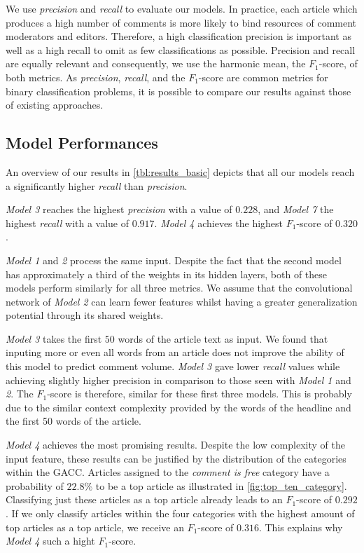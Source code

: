 We use \textit{precision} and \textit{recall} to evaluate our models. 
In practice, each article which produces a high number of comments is more likely to bind resources of comment moderators and editors.
Therefore, a high classification precision is important as well as a high recall to omit as few classifications as possible.
Precision and recall are equally relevant and consequently, we use the harmonic mean, the $F_1$-score, of both metrics. As \textit{precision}, \textit{recall}, and the $F_1$-score are common metrics for binary classification problems, it is possible to compare our results against those of existing approaches.

\subsection{Model Performances}
An overview of our results in \autoref{tbl:results_basic} depicts that all our models reach a significantly higher \textit{recall} than \textit{precision}.

\textit{Model 3} reaches the highest \textit{precision} with a value of $0.228$, and \textit{Model 7} the highest \textit{recall} with a value of $0.917$. \textit{Model 4} achieves the highest $F_1$-score of $0.320$. 



\textit{Model 1} and \textit{2} process the same input. Despite the fact that the second model has approximately a third of the weights in its hidden layers, both of these models perform similarly for all three metrics.
We assume that the convolutional network of \textit{Model 2} can learn fewer features whilst having a greater generalization potential through its shared weights.

\textit{Model 3} takes the first $50$ words of the article text as input. 
We found that inputing more or even all words from an article does not improve the ability of this model to predict comment volume.
\textit{Model 3} gave lower \textit{recall} values while achieving slightly higher precision in comparison to those seen with \textit{Model 1} and \textit{2}. 
The $F_1$-score is therefore, similar for these first three models.
This is probably due to the similar context complexity provided by the words of the headline and the first 50 words of the article.

\textit{Model 4} achieves the most promising results. 
Despite the low complexity of the input feature, these results can be justified by the distribution of the categories within the GACC. 
Articles assigned to the \textit{comment is free} category have a probability of $22.8\%$ to be a top article as illustrated in \autoref{fig:top_ten_category}. 
Classifying just these articles as a top article already leads to an $F_1$-score of $0.292$.
If we only classify articles within the four categories with the highest amount of top articles as a top article, we receive an $F_1$-score of $0.316$. 
This explains why \textit{Model 4} such a hight $F_1$-score.

